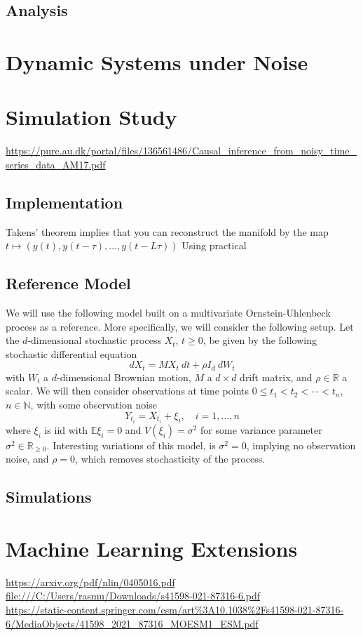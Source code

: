 \documentclass[11pt, a4paper]{memoir}
\theoremstyle{break}
\theoremstyle{break}
\theoremstyle{nonumberplain}
\begin{document}
\section{Analysis}


\chapter{Dynamic Systems under Noise}
\cite{StableManifoldStoc} 

\chapter{Simulation Study}
\url{https://pure.au.dk/portal/files/136561486/Causal_inference_from_noisy_time_series_data_AM17.pdf}
\section{Implementation}
Takens' theorem implies that you can reconstruct the manifold by the map
$t\mapsto (y(t),y(t-\tau),...,y(t-L\tau))$
Using practical  
\section{Reference Model}
We will use the following model built on a multivariate Ornstein-Uhlenbeck process as a reference. More specifically, we will consider the following setup. Let the $d$-dimensional stochastic process $X_t$, $t\geqslant 0$, be given by the following stochastic differential equation
$$dX_t=M X_t\ dt+\rho I_d\ dW_t$$
with $W_t$ a $d$-dimensional  Brownian motion, $M$ a $d\times d$ drift matrix, and $\rho\in \mathbb{R}$ a scalar. We will then consider observations at time points $0\leqslant t_1<t_2<\cdots <t_n$, $n\in \mathbb{N}$, with some observation noise
$$Y_{t_i}=X_{t_i}+\xi_i,\quad i=1,...,n$$
where $\xi_i$ is iid with $\mathbb{E} \xi_i=0$ and $V(\xi_i)=\sigma^2$ for some variance parameter $\sigma^2\in \mathbb{R}_{\geqslant 0}$. Interesting variations of this model, is $\sigma^2=0$, implying no observation noise, and $\rho=0$, which removes stochasticity of the process.

\section{Simulations}
 

\chapter{Machine Learning Extensions}
\url{https://arxiv.org/pdf/nlin/0405016.pdf}\\[5pt]
\url{file:///C:/Users/rasmu/Downloads/s41598-021-87316-6.pdf}\\[5pt]
\url{https://static-content.springer.com/esm/art%3A10.1038%2Fs41598-021-87316-6/MediaObjects/41598_2021_87316_MOESM1_ESM.pdf}


\end{document}
